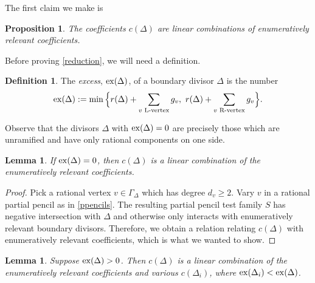 \documentclass[reqno, 10 pt]{article}
\newtheorem{lem}[thm]{Lemma}
\newtheorem{prop}[thm]{Proposition}
\theoremstyle{definition}
\newtheorem{defn}[thm]{Definition}
\theoremstyle{remark}
\numberwithin{equation}{section}
\numberwithin{thm}{section}
\numberwithin{prop}{section}
\numberwithin{lem}{section}
\numberwithin{cor}{section}
\numberwithin{conj}{section}
\numberwithin{defn}{section}
\begin{document}
    The first claim we make is

    \begin{prop}\label{reduction}
    The coefficients $c(\Delta)$ are linear combinations of enumeratively relevant coefficients.
    \end{prop}
      Before proving \autoref{reduction}, we will need a definition. 
     
     \begin{defn}
     The  {\sl excess}, ${\rm ex}(\Delta)$, of a boundary divisor $\Delta$ is the number  
     \[{\rm ex}(\Delta) : = \min \Big\{r(\Delta)+ \sum_{v \,\, \textrm{L-vertex}} g_v ,\,\, r(\Delta)+ \sum_{v \,\,\textrm{R-vertex}} g_v \Big\}.\] 
     \end{defn}
     
    Observe that the divisors $\Delta$ with ${\rm ex}(\Delta) = 0$ are precisely those which are unramified and have only rational components on one side. 


    \begin{lem}\label{lem1}
    If ${\rm ex}(\Delta) =0$, then $c(\Delta)$ is a linear combination of the enumeratively relevant coefficients.
    \end{lem}
    \begin{proof}
       Pick a rational vertex $v \in \Gamma_{\Delta}$ which has degree $d_v \geq 2$.  Vary $v$ in a rational partial pencil as in \autoref{ppencils}.  The resulting partial pencil test family $S$ has negative intersection with $\Delta$ and otherwise only interacts with enumeratively relevant boundary divisors.  Therefore, we obtain a relation relating $c(\Delta)$ with enumeratively relevant coefficients, which is what we wanted to show.
    \end{proof}





    



    \begin{lem}\label{lem2}
    Suppose ${\rm ex}(\Delta) > 0$.  Then $c(\Delta)$ is a linear combination of the enumeratively relevant coefficients and various $c(\Delta_i)$,  where ${\rm ex}(\Delta_i) < {\rm ex}(\Delta)$.
    \end{lem}
\end{document}
